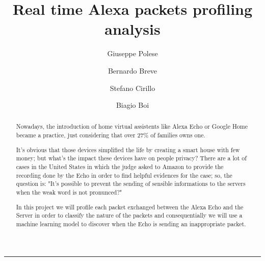 \documentclass[sigconf]{acmart}
\begin{document}
    \title{Real time Alexa packets profiling analysis}


    \author{Giuseppe Polese}

    \author{Bernardo Breve}
    \author{Stefano Cirillo}

    \author{Biagio Boi}

    \begin{abstract}
        Nowadays, the introduction of home virtual assistents like Alexa Echo or Google Home became a practice, just considering that over 27\% of families owns one.

        It's obvious that those devices simplified the life by creating a smart house with few money; but what's the impact these devices have on people privacy?
        There are a lot of cases in the United States in which the judge asked to Amazon to provide the recording done by the Echo in order to find helpful
        evidences for the case; so, the question is: "It's possible to prevent the sending of sensible informations to the servers when the weak word is not pronunced?"

        In this project we will profile each packet exchanged between the Alexa Echo and the Server in order to classify the nature of the packets and consequentially we will use a machine learning model to discover when the Echo is sending an inappropriate packet.
    \end{abstract}



    \begin{teaserfigure}
        \rule{\linewidth}{1mm}
    \end{teaserfigure}
\end{document}
